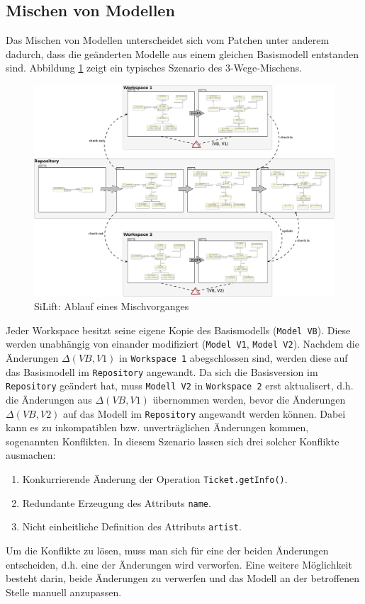 \subsection{Mischen von Modellen}
\label{sec:merging}

Das Mischen von Modellen unterscheidet sich vom Patchen unter anderem dadurch, dass die geänderten Modelle aus einem gleichen Basismodell entstanden sind.
Abbildung \ref{silift-tutorial_difference_merging} zeigt ein typisches Szenario des 3-Wege-Mischens.

\begin{figure}[H]
\centering
\includegraphics[width=\textwidth]{merging/graphics/silift-tutorial_difference_merging.png}
\caption{SiLift: Ablauf eines Mischvorganges}
\label{silift-tutorial_difference_merging}
\end{figure}

Jeder Workspace besitzt seine eigene Kopie des Basismodells (\texttt{Model VB}).
Diese werden unabhängig von einander modifiziert (\texttt{Model V1}, \texttt{Model V2}).
Nachdem die Änder\-ung\-en $\Delta(VB,V1)$ in \texttt{Workspace 1} abegschlossen sind, werden diese auf das Basismodell im \texttt{Repository} angewandt.
Da sich die Basisversion im \texttt{Repository} geändert hat, muss \texttt{Modell V2} in \texttt{Workspace 2} erst aktualisert, d.h. die Änderungen aus $\Delta(VB,V1)$ über\-nom\-men werden, bevor die Änderungen $\Delta(VB,V2)$ auf das Modell im \texttt{Repository} angewandt werden können.
Dabei kann es zu inkompatiblen bzw. unverträglichen Änderungen kommen, sogenannten Konflikten.
In diesem Szenario lassen sich drei solcher Konflikte ausmachen:
\begin{enumerate}[(1)]
	\item Konkurrierende Änderung der Operation \texttt{Ticket.getInfo()}.
	\item Redundante Erzeugung des Attributs \texttt{name}.
	\item Nicht einheitliche Definition des Attributs \texttt{artist}.
\end{enumerate}
Um die Konflikte zu lösen, muss man sich für eine der beiden Änderungen entscheiden, d.h. eine der Änderungen wird verworfen.
Eine weitere Möglichkeit besteht darin, beide Änderungen zu verwerfen und das Modell an der betroffenen Stelle manuell anzupassen.\\

